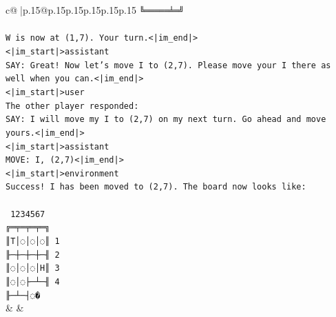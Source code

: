 \documentclass{article}
\begin{document}
{\begin{supertabular}{c@{$\;$}|p{.15\linewidth}@{}p{.15\linewidth}p{.15\linewidth}p{.15\linewidth}p{.15\linewidth}p{.15\linewidth}}
{{{\texttt{╚═════╧═╝} \\
\\ 
\texttt{W is now at (1,7). Your turn.<|im\_end|>} \\
\texttt{<|im\_start|>assistant} \\
\texttt{SAY: Great! Now let's move I to (2,7). Please move your I there as well when you can.<|im\_end|>} \\
\texttt{<|im\_start|>user} \\
\texttt{The other player responded:} \\
\texttt{SAY: I will move my I to (2,7) on my next turn. Go ahead and move yours.<|im\_end|>} \\
\texttt{<|im\_start|>assistant} \\
\texttt{MOVE: I, (2,7)<|im\_end|>} \\
\texttt{<|im\_start|>environment} \\
\texttt{Success! I has been moved to (2,7). The board now looks like:} \\
\\ 
\texttt{ 1234567} \\
\texttt{╔═╤═╤═╤═╗} \\
\texttt{║T│◌│◌│◌║ 1} \\
\texttt{╟─┼─┼─┼─╢ 2} \\
\texttt{║◌│◌│◌│H║ 3} \\
\texttt{║◌│◌├─┴─╢ 4} \\
\texttt{╟─┴─┤◌�} \\
            }
        }
    }
    & & \\ \\


\end{supertabular}}
\end{document}
